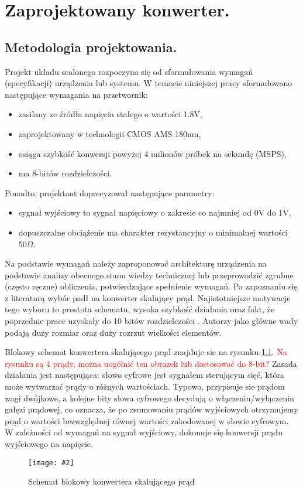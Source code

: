 \documentclass[10pt,a4paper]{report}
\newcommand{\img}[4]{
	\begin{figure}[H]
		\begin{center}
			\texttt{[image: \#2]}
			\caption{#3}
			\label{#4}
		\end{center}
	\end{figure}
}
\begin{document}
	\chapter{Zaprojektowany konwerter.}
	\section{Metodologia projektowania.}
	{	Projekt układu scalonego rozpoczyna się od sformułowania wymagań (specyfikacji) urządzenia lub systemu. W temacie niniejszej pracy 	sformułowano następujące wymagania na przetwornik:
		\begin{itemize}
			\item zasilany ze źródła napięcia stałego o wartości 1.8V,
			\item zaprojektowany w technologii CMOS AMS 180nm,
			\item osiąga szybkość konwersji powyżej 4 milionów próbek na sekundę (MSPS),
			\item ma 8-bitów rozdzielczości.
		\end{itemize} 
		Ponadto, projektant doprecyzował następujące parametry:
		\begin{itemize}
			\item sygnał wyjściowy to sygnał napięciowy o zakresie co najmniej od 0V do 1V,
			\item dopuszczalne obciążenie ma charakter rezystancyjny o minimalnej wartości $50\Omega$.
		\end{itemize} }
	
	{	Na podstawie wymagań należy zaproponować architekturę urządzenia na podstawie analizy obecnego stanu wiedzy technicznej lub przeprowadzić zgrubne (często ręczne) obliczenia, potwierdzające spełnienie wymagań. Po zapoznaniu się z literaturą wybór padł na konwerter skalujący prąd. Najistotniejsze motywacje tego wyboru to prostota schematu, wysoka szybkość działania \cite{cmosanal} oraz fakt, że poprzednie prace uzyskały do 10 bitów rozdzielczości \cite{plassche}.	Autorzy \cite{cmosanal} jako główne wady podają duży rozmiar oraz duży rozrzut wielkości elementów.}
	
	{	Blokowy schemat konwertera skalującego prąd znajduje sie na rysunku \ref{currentscale}. \textcolor{red}{Na rysunku są 4 prądy, można uogólnić ten obrazek lub dostosować do 8-bit?} Zasada działania jest następująca: słowo cyfrowe jest sygnałem sterującym sięć, która może wytwarzać prądy o różnych wartościach. Typowo, przypisuje sie prądom wagi dwójkowe, a kolejne bity słowa cyfrowego decydują o włączeniu/wyłączeniu gałęzi prądowej, co oznacza, że po zsumowaniu prądów wyjściowych otrzymujemy prąd o wartości  bezwzględnej równej wartości zakodowanej w słowie cyfrowym. W zależności od wymagań na sygnał wyjściowy, dokonuje się konwersji prądu wyjściowego na napięcie. 
		\img{20}{../visio/currentscale.pdf}{Schemat blokowy konwertera skalującego prąd}{currentscale}	}
\end{document}
